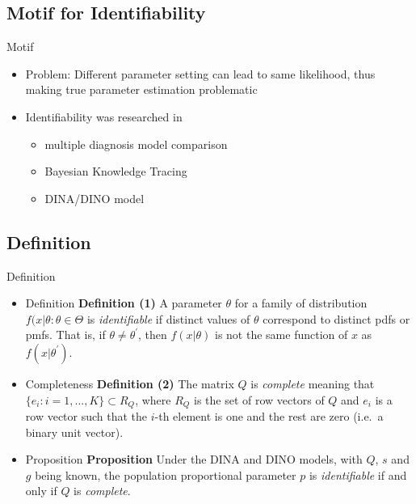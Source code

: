\documentclass[handout]{beamer}
\begin{document}
\subsection[Motif]{Motif for Identifiability}
\begin{frame}{Motif}
\begin{itemize}
\item{Problem: Different parameter setting can lead to same likelihood, thus making true parameter estimation problematic}
\item{Identifiability was researched in}
	\begin{itemize}
	\item{multiple diagnosis model comparison}
	\item{Bayesian Knowledge Tracing}
	\item{DINA/DINO model}
	\end{itemize}
\end{itemize}
\end{frame}

\subsection[Definition]{Definition}
\begin{frame}{Definition}
	\begin{itemize}
	\item{Definition}
\textbf{Definition (1)} \cite{casella2002statistical} A parameter $\theta$ for a family of distribution ${f(x|\theta: \theta \in \Theta}$ is \textit{identifiable} if distinct values of $\theta$ correspond to distinct pdfs or pmfs. That is, if $\theta \neq \theta^{\prime}$, then $f(x|\theta)$ is not the same function of $x$ as $f(x|\theta^{\prime})$.
	\item{Completeness}
\textbf{Definition (2)} \cite{chen2015statistical}  The matrix $Q$ is \textit{complete} meaning that $\{e_{i}:i=1,...,K\} \subset R_{Q}$, where $R_{Q}$ is the set of row vectors of $Q$ and $e_{i}$ is a row vector such that the $i$-th element is one and the rest are zero (i.e.\ a binary unit vector).
	\item{Proposition}
\textbf{Proposition} \cite{chen2015statistical} Under the DINA and DINO models, with $Q$, $s$ and $g$ being known, the population proportional parameter $p$ is \textit{identifiable} if and only if $Q$ is \textit{complete}.
	\end{itemize}
\end{frame}
\end{document}
